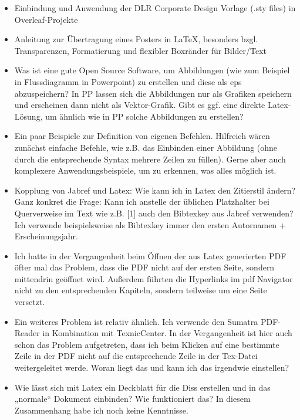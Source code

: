 \documentclass[ngerman]{beamer}
\begin{document}
\begin{frame}

\begin{itemize}
\item Einbindung und Anwendung der DLR Corporate Design Vorlage (.sty files) in Overleaf-Projekte
\item Anleitung zur Übertragung eines Posters in LaTeX, besonders bzgl. Transparenzen, Formatierung und flexibler Boxränder für Bilder/Text
\end{itemize}
\end{frame}


\begin{frame}[allowframebreaks]

\begin{itemize}
\item Was ist eine gute Open Source Software, um Abbildungen (wie zum Beispiel in Flussdiagramm in Powerpoint) zu erstellen und diese als eps abzuspeichern? In PP lassen sich die Abbildungen nur als Grafiken speichern und erscheinen dann nicht als Vektor-Grafik. Gibt es ggf. eine direkte Latex-Lösung, um ähnlich wie in PP solche Abbildungen zu erstellen?
 
\item Ein paar Beispiele zur Definition von eigenen Befehlen. Hilfreich wären zunächst einfache Befehle, wie z.B. das Einbinden einer Abbildung (ohne durch die entsprechende Syntax mehrere Zeilen zu füllen). Gerne aber auch komplexere Anwendungsbeispiele, um zu erkennen, was alles möglich ist.
 
\item  
Kopplung von Jabref und Latex: Wie kann ich in Latex den Zitierstil ändern? Ganz konkret die Frage: Kann ich anstelle der üblichen Platzhalter bei Querverweise im Text wie z.B. [1] auch den Bibtexkey aus Jabref verwenden? Ich verwende beispielsweise als Bibtexkey immer den ersten Autornamen + Erscheinungsjahr.
 
\item 
Ich hatte in der Vergangenheit beim Öffnen der aus Latex generierten PDF öfter mal das Problem, dass die PDF nicht auf der ersten Seite, sondern mittendrin geöffnet wird. Außerdem führten die Hyperlinks im pdf Navigator nicht zu den entsprechenden Kapiteln, sondern teilweise um eine Seite versetzt.
 
\item 
Ein weiteres Problem ist relativ ähnlich. Ich verwende den Sumatra PDF-Reader in Kombination mit TexnicCenter. In der Vergangenheit ist hier auch schon das Problem aufgetreten, dass ich beim Klicken auf eine bestimmte Zeile in der PDF nicht auf die entsprechende Zeile in der Tex-Datei weitergeleitet werde. Woran liegt das und kann ich das irgendwie einstellen?
 
\item 
Wie lässt sich mit Latex ein Deckblatt für die Diss erstellen und in das „normale“ Dokument einbinden? Wie funktioniert das? In diesem Zusammenhang habe ich noch keine Kenntnisse.
\end{itemize}
\end{frame}
\end{document}
